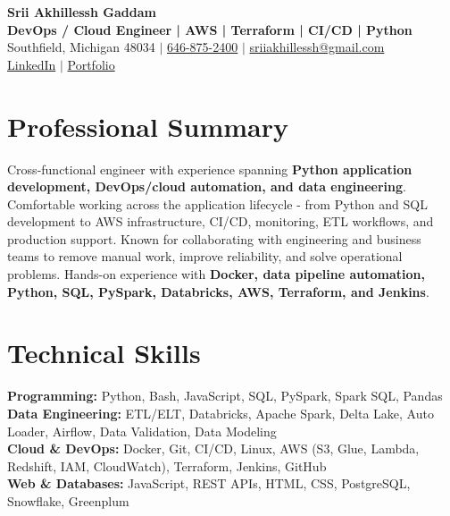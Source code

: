 \documentclass[letterpaper,10pt]{article}
\begin{document}
\fontsize{9.35pt}{10.45pt}\selectfont

\begin{center}
    {\LARGE \textbf{Srii Akhillessh Gaddam}} \\[-1pt]
    \textbf{DevOps / Cloud Engineer | AWS | Terraform | CI/CD | Python} \\[2pt]
    Southfield, Michigan 48034 $|$
    \href{tel:6468752400}{646-875-2400} $|$
    \href{mailto:sriiakhillessh@gmail.com}{sriiakhillessh@gmail.com} \\[1pt]
    \href{https://www.linkedin.com/in/srii-akhiilessh-gaddam-b48668191/}{LinkedIn} $|$
    \href{https://sriiakhillesshg.github.io/portfolio/}{Portfolio}
\end{center}
\vspace{-8pt}

\section{Professional Summary}
\small{Cross-functional engineer with experience spanning \textbf{Python application development, DevOps/cloud automation, and data engineering}. Comfortable working across the application lifecycle - from Python and SQL development to AWS infrastructure, CI/CD, monitoring, ETL workflows, and production support. Known for collaborating with engineering and business teams to remove manual work, improve reliability, and solve operational problems. Hands-on experience with \textbf{Docker, data pipeline automation, Python, SQL, PySpark, Databricks, AWS, Terraform, and Jenkins}.}

\section{Technical Skills}
\small{
\textbf{Programming:} Python, Bash, JavaScript, SQL, PySpark, Spark SQL, Pandas \\
\textbf{Data Engineering:} ETL/ELT, Databricks, Apache Spark, Delta Lake, Auto Loader, Airflow, Data Validation, Data Modeling \\
\textbf{Cloud \& DevOps:} Docker, Git, CI/CD, Linux, AWS (S3, Glue, Lambda, Redshift, IAM, CloudWatch), Terraform, Jenkins, GitHub \\
\textbf{Web \& Databases:} JavaScript, REST APIs, HTML, CSS, PostgreSQL, Snowflake, Greenplum
}
\end{document}
